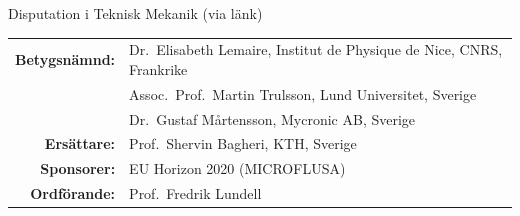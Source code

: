 \begin{frame}[plain]{Disputation i Teknisk Mekanik (via länk)}
\begin{longtable}[]{@{}rl@{}}
    \begin{minipage}[t]{0.22\columnwidth}\raggedleft
      \textbf{Betygsnämnd:}\strut
    \end{minipage} & \begin{minipage}[t]{0.72\columnwidth}\raggedright
      Dr.~Elisabeth Lemaire, Institut de Physique de Nice, CNRS, Frankrike\strut
    \end{minipage}\tabularnewline
    \begin{minipage}[t]{0.22\columnwidth}\raggedleft
      \strut
    \end{minipage} & \begin{minipage}[t]{0.72\columnwidth}\raggedright
      Assoc.~Prof.~Martin Trulsson, Lund Universitet, Sverige\strut
    \end{minipage}\tabularnewline
    \begin{minipage}[t]{0.22\columnwidth}\raggedleft
      \strut
    \end{minipage} & \begin{minipage}[t]{0.72\columnwidth}\raggedright
      Dr.~Gustaf M\aa rtensson, Mycronic AB, Sverige\strut
    \end{minipage}\tabularnewline
    \begin{minipage}[t]{0.22\columnwidth}\raggedleft
      \textbf{Ersättare:}\strut
    \end{minipage} & \begin{minipage}[t]{0.72\columnwidth}\raggedright
      Prof.~Shervin Bagheri, KTH, Sverige\strut
    \end{minipage}\tabularnewline
    \begin{minipage}[t]{0.22\columnwidth}\raggedleft
      \textbf{Sponsorer:}\strut
    \end{minipage} & \begin{minipage}[t]{0.72\columnwidth}\raggedright
      EU Horizon 2020 (MICROFLUSA)\strut
    \end{minipage}\tabularnewline
    
    \begin{minipage}[t]{0.22\columnwidth}\raggedleft
      \textbf{Ordförande:}\strut
    \end{minipage} & \begin{minipage}[t]{0.72\columnwidth}\raggedright
      Prof.~Fredrik Lundell\strut
    \end{minipage}\tabularnewline

    \bottomrule
  \end{longtable}
\end{frame}

